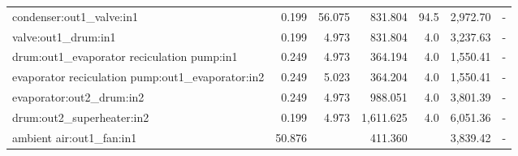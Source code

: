 \begin{table}[H]
\begin{tabular}{lrrrrrr}
condenser:out1\_valve:in1                             &                     0.199 &                                             56.075 &                    831.804 &                                                       94.5 &                   2,972.70 &                                                                                           - \\
valve:out1\_drum:in1                                  &                     0.199 &                                              4.973 &                    831.804 &                                                        4.0 &                   3,237.63 &                                                                                           - \\
drum:out1\_evaporator reciculation pump:in1           &                     0.249 &                                              4.973 &                    364.194 &                                                        4.0 &                   1,550.41 &                                                                                           - \\
evaporator reciculation pump:out1\_evaporator:in2     &                     0.249 &                                              5.023 &                    364.204 &                                                        4.0 &                   1,550.41 &                                                                                           - \\
evaporator:out2\_drum:in2                             &                     0.249 &                                              4.973 &                    988.051 &                                                        4.0 &                   3,801.39 &                                                                                           - \\
drum:out2\_superheater:in2                            &                     0.199 &                                              4.973 &                  1,611.625 &                                                        4.0 &                   6,051.36 &                                                                                           - \\
ambient air:out1\_fan:in1                             &                    50.876 &                                       \bftab 1.000 &                    411.360 &                                                \bftab 12.0 &                   3,839.42 &                                                                                           - \\

\end{tabular}
\end{table}
